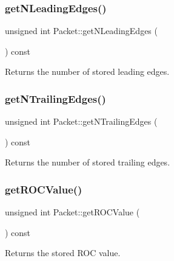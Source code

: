 \subsubsection{\texorpdfstring{get\+N\+Leading\+Edges()}{getNLeadingEdges()}}
{\footnotesize\ttfamily unsigned int Packet\+::get\+N\+Leading\+Edges (\begin{DoxyParamCaption}{ }\end{DoxyParamCaption}) const\hspace{0.3cm}{\ttfamily [inline]}}



Returns the number of stored leading edges. 

\mbox{\label{class_packet_aed7b21042c14e00546a2f4600d3b57d1}} 
\subsubsection{\texorpdfstring{get\+N\+Trailing\+Edges()}{getNTrailingEdges()}}
{\footnotesize\ttfamily unsigned int Packet\+::get\+N\+Trailing\+Edges (\begin{DoxyParamCaption}{ }\end{DoxyParamCaption}) const\hspace{0.3cm}{\ttfamily [inline]}}



Returns the number of stored trailing edges. 

\mbox{\label{class_packet_a2a46912b82833c80b53e01114ef701a1}} 
\subsubsection{\texorpdfstring{get\+R\+O\+C\+Value()}{getROCValue()}}
{\footnotesize\ttfamily unsigned int Packet\+::get\+R\+O\+C\+Value (\begin{DoxyParamCaption}{ }\end{DoxyParamCaption}) const\hspace{0.3cm}{\ttfamily [inline]}}



Returns the stored R\+OC value. 

\mbox{\label{class_packet_a4f4c3d99d89506a577073a2ce9e75e95}} 

